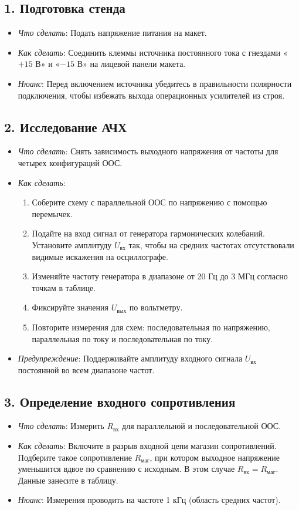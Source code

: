 \subsection*{1. Подготовка стенда}
\begin{itemize}
    \item \textit{Что сделать}: Подать напряжение питания на макет.
    \item \textit{Как сделать}: Соединить клеммы источника постоянного тока с гнездами «$+15$ В» и «$-15$ В» на лицевой панели макета.
    \item \textit{Нюанс}: Перед включением источника убедитесь в правильности полярности подключения, чтобы избежать выхода операционных усилителей из строя.
\end{itemize}

\subsection*{2. Исследование АЧХ}
\begin{itemize}
    \item \textit{Что сделать}: Снять зависимость выходного напряжения от частоты для четырех конфигураций ООС.
    \item \textit{Как сделать}: 
    \begin{enumerate}
        \item Соберите схему с параллельной ООС по напряжению с помощью перемычек.
        \item Подайте на вход сигнал от генератора гармонических колебаний. Установите амплитуду $U_{вх}$ так, чтобы на средних частотах отсутствовали видимые искажения на осциллографе.
        \item Изменяйте частоту генератора в диапазоне от 20 Гц до 3 МГц согласно точкам в таблице.
        \item Фиксируйте значения $U_{вых}$ по вольтметру.
        \item Повторите измерения для схем: последовательная по напряжению, параллельная по току и последовательная по току.
    \end{enumerate}
    \item \textit{Предупреждение}: Поддерживайте амплитуду входного сигнала $U_{вх}$ постоянной во всем диапазоне частот.
\end{itemize}

\subsection*{3. Определение входного сопротивления}
\begin{itemize}
    \item \textit{Что сделать}: Измерить $R_{вх}$ для параллельной и последовательной ООС.
    \item \textit{Как сделать}: Включите в разрыв входной цепи магазин сопротивлений. Подберите такое сопротивление $R_{маг}$, при котором выходное напряжение уменьшится вдвое по сравнению с исходным. В этом случае $R_{вх} = R_{маг}$. Данные занесите в таблицу.
    \item \textit{Нюанс}: Измерения проводить на частоте 1 кГц (область средних частот).
\end{itemize}

